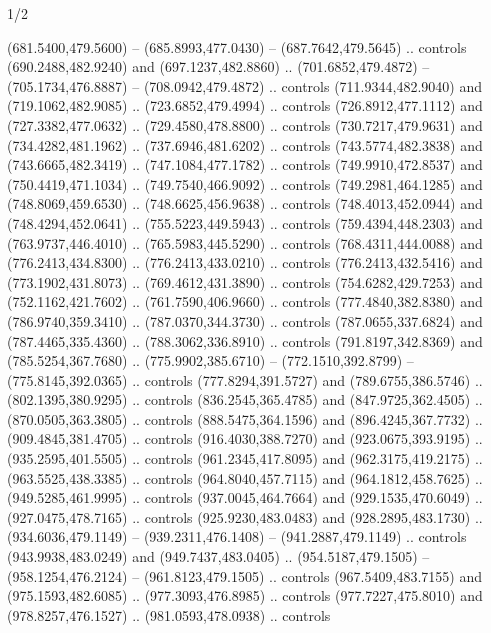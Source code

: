 \begin{flagdescription}{1/2}
\begin{scope}[shift={(2*\flaglength/3-0.25*\rb,0.51333\flagwidth)},scale=0.001715\flagwidth*\stretchfactor]
\begin{scope}[y=-1pt, x=1pt,cm={{1.04354,0.0,0.0,1.01818,(-827,-297)}}]
\begin{scope}[draw=black,line width=0.015\flagwidth]
\begin{scope}[fill=gold]
 (681.5400,479.5600) -- (685.8993,477.0430) --
  (687.7642,479.5645) .. controls (690.2488,482.9240) and (697.1237,482.8860) ..
  (701.6852,479.4872) -- (705.1734,476.8887) -- (708.0942,479.4872) .. controls
  (711.9344,482.9040) and (719.1062,482.9085) .. (723.6852,479.4994) .. controls
  (726.8912,477.1112) and (727.3382,477.0632) .. (729.4580,478.8800) .. controls
  (730.7217,479.9631) and (734.4282,481.1962) .. (737.6946,481.6202) .. controls
  (743.5774,482.3838) and (743.6665,482.3419) .. (747.1084,477.1782) .. controls
  (749.9910,472.8537) and (750.4419,471.1034) .. (749.7540,466.9092) .. controls
  (749.2981,464.1285) and (748.8069,459.6530) .. (748.6625,456.9638) .. controls
  (748.4013,452.0944) and (748.4294,452.0641) .. (755.5223,449.5943) .. controls
  (759.4394,448.2303) and (763.9737,446.4010) .. (765.5983,445.5290) .. controls
  (768.4311,444.0088) and (776.2413,434.8300) .. (776.2413,433.0210) .. controls
  (776.2413,432.5416) and (773.1902,431.8073) .. (769.4612,431.3890) .. controls
  (754.6282,429.7253) and (752.1162,421.7602) .. (761.7590,406.9660) .. controls
  (777.4840,382.8380) and (786.9740,359.3410) .. (787.0370,344.3730) .. controls
  (787.0655,337.6824) and (787.4465,335.4360) .. (788.3062,336.8910) .. controls
  (791.8197,342.8369) and (785.5254,367.7680) .. (775.9902,385.6710) --
  (772.1510,392.8799) -- (775.8145,392.0365) .. controls (777.8294,391.5727) and
  (789.6755,386.5746) .. (802.1395,380.9295) .. controls (836.2545,365.4785) and
  (847.9725,362.4505) .. (870.0505,363.3805) .. controls (888.5475,364.1596) and
  (896.4245,367.7732) .. (909.4845,381.4705) .. controls (916.4030,388.7270) and
  (923.0675,393.9195) .. (935.2595,401.5505) .. controls (961.2345,417.8095) and
  (962.3175,419.2175) .. (963.5525,438.3385) .. controls (964.8040,457.7115) and
  (964.1812,458.7625) .. (949.5285,461.9995) .. controls (937.0045,464.7664) and
  (929.1535,470.6049) .. (927.0475,478.7165) .. controls (925.9230,483.0483) and
  (928.2895,483.1730) .. (934.6036,479.1149) -- (939.2311,476.1408) --
  (941.2887,479.1149) .. controls (943.9938,483.0249) and (949.7437,483.0405) ..
  (954.5187,479.1505) -- (958.1254,476.2124) -- (961.8123,479.1505) .. controls
  (967.5409,483.7155) and (975.1593,482.6085) .. (977.3093,476.8985) .. controls
  (977.7227,475.8010) and (978.8257,476.1527) .. (981.0593,478.0938) .. controls

\end{scope}
\end{scope}
\end{scope}
\end{scope}
\end{flagdescription}
